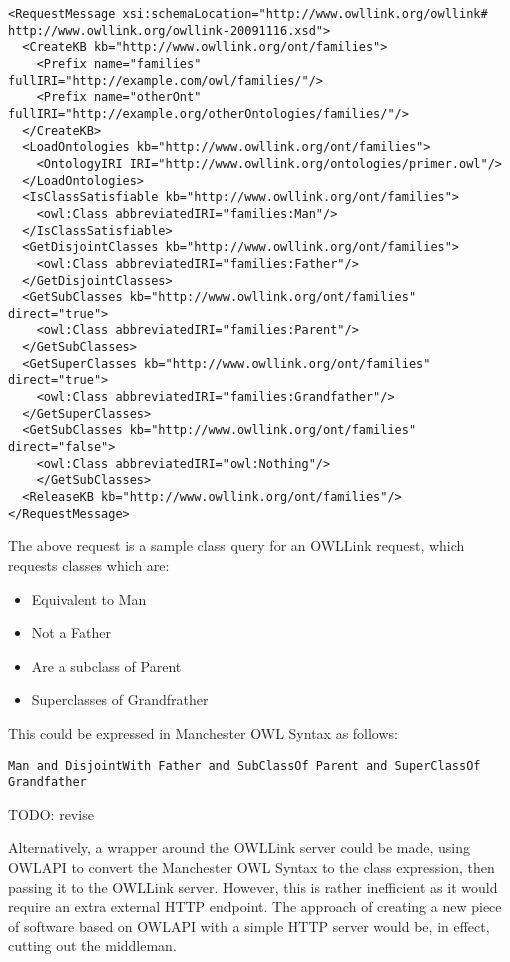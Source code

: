 \documentclass{article}
\begin{document}
\begin{lstlisting}
<RequestMessage xsi:schemaLocation="http://www.owllink.org/owllink# http://www.owllink.org/owllink-20091116.xsd">
  <CreateKB kb="http://www.owllink.org/ont/families">
    <Prefix name="families" fullIRI="http://example.com/owl/families/"/>
    <Prefix name="otherOnt" fullIRI="http://example.org/otherOntologies/families/"/>
  </CreateKB>
  <LoadOntologies kb="http://www.owllink.org/ont/families">
    <OntologyIRI IRI="http://www.owllink.org/ontologies/primer.owl"/>
  </LoadOntologies>
  <IsClassSatisfiable kb="http://www.owllink.org/ont/families">
    <owl:Class abbreviatedIRI="families:Man"/>
  </IsClassSatisfiable>
  <GetDisjointClasses kb="http://www.owllink.org/ont/families">
    <owl:Class abbreviatedIRI="families:Father"/>
  </GetDisjointClasses>
  <GetSubClasses kb="http://www.owllink.org/ont/families" direct="true">
    <owl:Class abbreviatedIRI="families:Parent"/>
  </GetSubClasses>
  <GetSuperClasses kb="http://www.owllink.org/ont/families" direct="true">
    <owl:Class abbreviatedIRI="families:Grandfather"/>
  </GetSuperClasses>
  <GetSubClasses kb="http://www.owllink.org/ont/families" direct="false">
    <owl:Class abbreviatedIRI="owl:Nothing"/>
    </GetSubClasses>
  <ReleaseKB kb="http://www.owllink.org/ont/families"/>
</RequestMessage>
\end{lstlisting}

The above request is a sample class query for an OWLLink request, which requests
classes which are:

\begin{itemize}
    \item Equivalent to Man
    \item Not a Father
    \item Are a subclass of Parent
    \item Superclasses of Grandfrather
\end{itemize}

This could be expressed in Manchester OWL Syntax as follows:

\begin{lstlisting}
Man and DisjointWith Father and SubClassOf Parent and SuperClassOf Grandfather
\end{lstlisting}

TODO: revise

Alternatively, a wrapper around the OWLLink server could be made, using OWLAPI
to convert the Manchester OWL Syntax to the class expression, then passing it to
the OWLLink server. However, this is rather inefficient as it would require an
extra external HTTP endpoint. The approach of creating a new piece of software 
based on OWLAPI with a simple HTTP server would be, in effect, cutting out the 
middleman.
\end{document}
